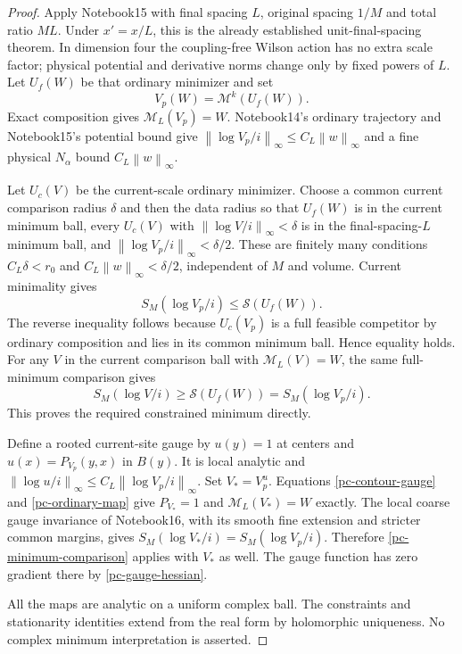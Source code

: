 \documentclass[11pt]{article}
\theoremstyle{remark}
\newcommand{\norm}[1]{\left\|#1\right\|}
\begin{document}
\begin{proof}
Apply Notebook15 with final spacing $L$, original spacing
$1/M$ and total ratio $ML$. Under $x'=x/L$, this is the
already established unit-final-spacing theorem. In dimension
four the coupling-free Wilson action has no extra scale
factor; physical potential and derivative norms change only
by fixed powers of $L$. Let $U_f(W)$ be that ordinary
minimizer and set
\[
 V_p(W)=\mathcal M^k(U_f(W)).
\]
Exact composition gives $\mathcal M_L(V_p)=W$.
Notebook14's ordinary trajectory and Notebook15's potential
bound give $\norm{\log V_p/i}_\infty\le C_L\norm w_\infty$
and a fine physical $N_\alpha$ bound $C_L\norm w_\infty$.

Let $U_c(V)$ be the current-scale ordinary minimizer. Choose a
common current comparison radius $\delta$ and then the data
radius so that $U_f(W)$ is in the current minimum ball,
every $U_c(V)$ with $\norm{\log V/i}_\infty<\delta$ is in
the final-spacing-$L$ minimum ball, and
$\norm{\log V_p/i}_\infty<\delta/2$. These are finitely many
conditions $C_L\delta<r_0$ and
$C_L\norm w_\infty<\delta/2$, independent of $M$ and volume.
Current minimality gives
\[
 S_M(\log V_p/i)\le\mathcal S(U_f(W)).
\]
The reverse inequality follows because $U_c(V_p)$ is a full
feasible competitor by ordinary composition and lies in its
common minimum ball. Hence equality holds. For any $V$ in the
current comparison ball with $\mathcal M_L(V)=W$, the same
full-minimum comparison gives
\begin{equation}\label{pc-minimum-comparison}
 S_M(\log V/i)\ge\mathcal S(U_f(W))=S_M(\log V_p/i).
\end{equation}
This proves the required constrained minimum directly.

Define a rooted current-site gauge by
$u(y)=1$ at centers and $u(x)=P_{V_p}(y,x)$ in $B(y)$.
It is local analytic and
$\norm{\log u/i}_\infty\le C_L\norm{\log V_p/i}_\infty$.
Set $V_*=V_p^u$. Equations
\eqref{pc-contour-gauge} and \eqref{pc-ordinary-map} give
$P_{V_*}=1$ and $\mathcal M_L(V_*)=W$ exactly. The local
coarse gauge invariance of Notebook16, with its smooth fine
extension and stricter common margins, gives
$S_M(\log V_*/i)=S_M(\log V_p/i)$. Therefore
\eqref{pc-minimum-comparison} applies with $V_*$ as well.
The gauge function has zero gradient there by
\eqref{pc-gauge-hessian}.

All the maps are analytic on a uniform complex ball. The
constraints and stationarity identities extend from the real
form by holomorphic uniqueness. No complex minimum
interpretation is asserted.
\end{proof}
\end{document}
